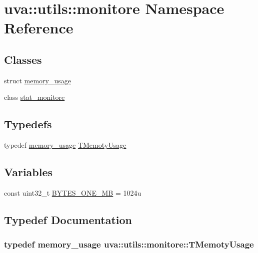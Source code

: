 \hypertarget{namespaceuva_1_1utils_1_1monitore}{}\section{uva\+:\+:utils\+:\+:monitore Namespace Reference}
\label{namespaceuva_1_1utils_1_1monitore}
\subsection*{Classes}
\begin{DoxyCompactItemize}
\item 
struct \hyperlink{structuva_1_1utils_1_1monitore_1_1memory__usage}{memory\+\_\+usage}
\item 
class \hyperlink{classuva_1_1utils_1_1monitore_1_1stat__monitore}{stat\+\_\+monitore}
\end{DoxyCompactItemize}
\subsection*{Typedefs}
\begin{DoxyCompactItemize}
\item 
typedef \hyperlink{structuva_1_1utils_1_1monitore_1_1memory__usage}{memory\+\_\+usage} \hyperlink{namespaceuva_1_1utils_1_1monitore_aa3ee5e440e3d902d9b6d26a24aa95c39}{T\+Memoty\+Usage}
\end{DoxyCompactItemize}
\subsection*{Variables}
\begin{DoxyCompactItemize}
\item 
const uint32\+\_\+t \hyperlink{namespaceuva_1_1utils_1_1monitore_a286c7985e00d8d56cb91210a3e801e54}{B\+Y\+T\+E\+S\+\_\+\+O\+N\+E\+\_\+\+M\+B} = 1024u
\end{DoxyCompactItemize}


\subsection{Typedef Documentation}
\hypertarget{namespaceuva_1_1utils_1_1monitore_aa3ee5e440e3d902d9b6d26a24aa95c39}{}
\subsubsection[{T\+Memoty\+Usage}]{\setlength{\rightskip}{0pt plus 5cm}typedef {\bf memory\+\_\+usage} {\bf uva\+::utils\+::monitore\+::\+T\+Memoty\+Usage}}\label{namespaceuva_1_1utils_1_1monitore_aa3ee5e440e3d902d9b6d26a24aa95c39}


